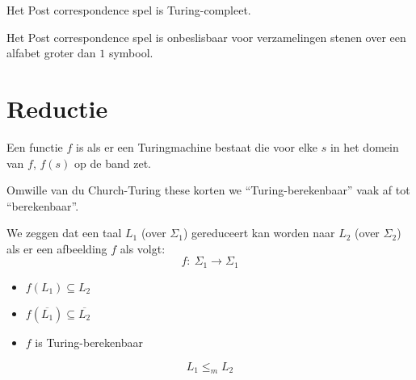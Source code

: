 \documentclass[main.tex]{subfiles}
\begin{document}
\begin{st}
  \label{st:pc-is-turing-compleet}
  Het Post correspondence spel is Turing-compleet.
\end{st}

\begin{gev}
  Het Post correspondence spel is onbeslisbaar voor verzamelingen stenen over een alfabet groter dan $1$ symbool.
\end{gev}


\section{Reductie}
\label{sec:reductie}

\begin{de}
  Een functie $f$ is  als er een Turingmachine bestaat die voor elke $s$ in het domein van $f$, $f(s)$ op de band zet.
\end{de}

\begin{de}
  Omwille van du Church-Turing these korten we ``Turing-berekenbaar'' vaak af tot ``berekenbaar''.
\end{de}

\begin{de}
  We zeggen dat een taal $L_1$ (over $\Sigma_1$) gereduceert kan worden naar $L_2$ (over $\Sigma_2$) als er een afbeelding $f$ als volgt:
  \[  f:\ \Sigma_1\rightarrow \Sigma_1  \]
  \begin{itemize}
    \item $f(L_1) \subseteq L_2$
    \item $f(\overline{L_1}) \subseteq \overline{L_2}$
    \item $f$ is Turing-berekenbaar
  \end{itemize}
  \[ L_1\le_m L_2 \]
\end{de}
\end{document}
